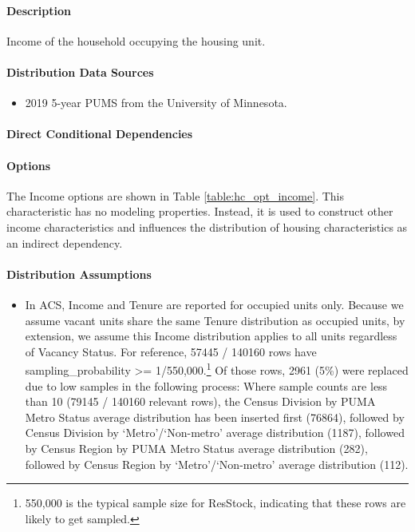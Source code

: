 \paragraph{Description}
% 
Income of the household occupying the housing unit.

\paragraph{Distribution Data Sources}
% 
\begin{itemize}
\item
  2019 5-year PUMS from the University of Minnesota.
\end{itemize}

\paragraph{Direct Conditional Dependencies}


\paragraph{Options}
The Income options are shown in Table \ref{table:hc_opt_income}. This characteristic has no modeling properties. Instead, it is used to construct other income characteristics and influences the distribution of housing characteristics as an indirect dependency.



\paragraph{Distribution Assumptions}
% 
\begin{itemize}
\item
  In ACS, Income and Tenure are reported for occupied units only.
  Because we assume vacant units share the same Tenure distribution as
  occupied units, by extension, we assume this Income distribution
  applies to all units regardless of Vacancy Status. For reference,
  57445 / 140160 rows have sampling\_probability \textgreater= 1/550,000.\footnote{550,000 is the typical sample size for ResStock, indicating that these rows are likely to get sampled.}
  Of those rows, 2961 (5\%) were replaced due to low samples in the
  following process: Where sample counts are less than 10 (79145 /
  140160 relevant rows), the Census Division by PUMA Metro Status
  average distribution has been inserted first (76864), followed by
  Census Division by
  `Metro'/`Non-metro'
  average distribution (1187), followed by Census Region by PUMA Metro
  Status average distribution (282), followed by Census Region by
  `Metro'/`Non-metro'
  average distribution (112).
\end{itemize}
